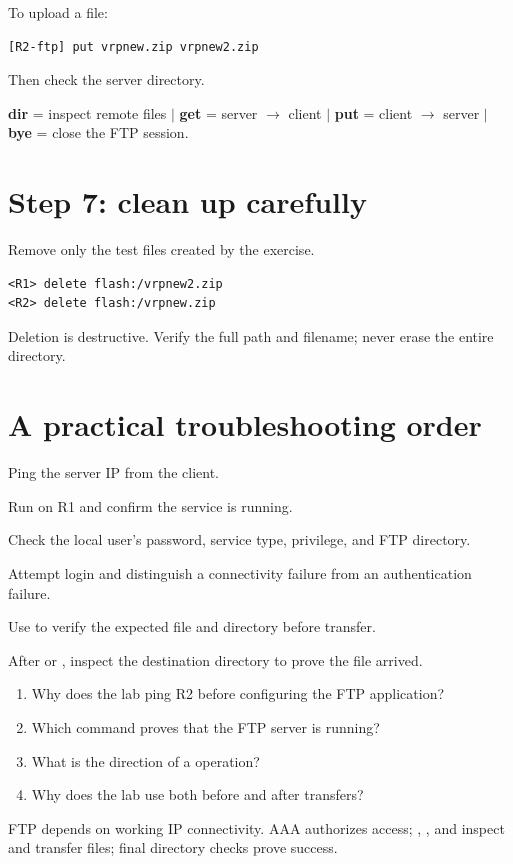 To upload a file:
\begin{lstlisting}[style=dcnterminal]
[R2-ftp] put vrpnew.zip vrpnew2.zip
\end{lstlisting}
Then check the server directory.

\begin{conceptmap}
\textbf{dir} = inspect remote files \quad $\vert$ \quad
\textbf{get} = server $\rightarrow$ client \quad $\vert$ \quad
\textbf{put} = client $\rightarrow$ server \quad $\vert$ \quad
\textbf{bye} = close the FTP session.
\end{conceptmap}

\section{Step 7: clean up carefully}
Remove only the test files created by the exercise.
\begin{lstlisting}[style=dcnterminal]
<R1> delete flash:/vrpnew2.zip
<R2> delete flash:/vrpnew.zip
\end{lstlisting}

\begin{pitfall}
Deletion is destructive. Verify the full path and filename; never erase the entire  directory.
\end{pitfall}

\section{A practical troubleshooting order}
\begin{netsteps}
\item Ping the server IP from the client.
\item Run  on R1 and confirm the service is running.
\item Check the local user's password, service type, privilege, and FTP directory.
\item Attempt login and distinguish a connectivity failure from an authentication failure.
\item Use  to verify the expected file and directory before transfer.
\item After  or , inspect the destination directory to prove the file arrived.
\end{netsteps}

\begin{quickcheck}
\begin{enumerate}
\item Why does the lab ping R2 before configuring the FTP application?
\item Which command proves that the FTP server is running?
\item What is the direction of a  operation?
\item Why does the lab use  both before and after transfers?
\end{enumerate}
\end{quickcheck}

\begin{chapterrecap}
FTP depends on working IP connectivity. AAA authorizes access; , , and  inspect and transfer files; final directory checks prove success.
\end{chapterrecap}


